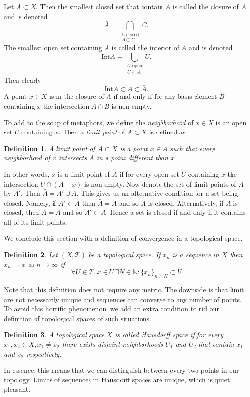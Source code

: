 \documentclass{article}
\newcommand{\Ta}{\mathcal{T}}
\newcommand{\N}{\mathbb{N}}
\newtheorem*{definition}{Definition}
\theoremstyle{remark}
\begin{document}
Let $A\subset X$. Then the smallest closed set that contain $A$ is called the closure of $A$ and is denoted 
$$\bar{A}=\bigcap_{\substack{C\text{ closed}\\A\subset C}} C.$$
The smallest open set containing $A$ is called the interior of $A$ and is denoted 
$$\text{Int} A = \bigcup_{\substack{U\text{ open}\\U\subset A}}U.$$ 
Then clearly
$$
    \text{Int}A\subset A\subset\bar{A}.
$$
A point $x\in X$ is in the closure of $A$ if and only if for any basis element $B$ containing $x$ the intersection $A\cap B$ is non empty.

To add to the soup of metaphors, we define the \textit{neighborhood} of $x\in X$ is an open set $U$ containing $x$. Then a \textit{limit point} of $A\subset X$ is defined as
\begin{definition}
    A limit point of $A\subset X$ is a point $x\in A$ such that every neighborhood of $x$ intersects $A$ in a point different than $x$
\end{definition}
In other words, $x$ is a limit point of $A$ if for every open set $U$ containing $x$ the intersection $U\cap(A-{x})$ is non empty. Now denote the set of limit points of $A$ by $A'$.
Then $\bar{A}=A'\cup A$. This gives us an alternative condition for a set being closed. Namely, if $A'\subset A$ then $\bar{A}=A$ and so $A$ is closed.
Alternatively, if $A$ is closed, then $\bar{A}=A$ and so $A'\subset A$.
Hence a set is closed if and only if it contains all of its limit points.

We conclude this section with a definition of convergence in a topological space.
\begin{definition}
    Let $(X,\Ta)$ be a topological space. If $x_n$ is a sequence in $X$ then $x_n\to x$ as $n\to\infty$ if
    $$
        \forall U\in\Ta, x\in U\,\exists N\in\N: \{x_n\}_{n\geq N}\subset U
    $$
\end{definition}
Note that this definition does not require any metric. The downside is that limit are not necessarily unique and sequences can converge to any number of points.
To avoid this horrific phenomenon, we add an extra condition to rid our definition of topological spaces of such situations. 
\begin{definition}
    A topological space $X$ is called \textit{Hausdorff space} if for every $x_1,x_2\in X, x_1\neq x_2$ there exists disjoint neighborhoods $U_1$ and $U_2$ that contain $x_1$ and $x_2$ respectively.
\end{definition}
In essence, this means that we can distinguish between every two points in our topology. Limits of sequences in Hausdorff spaces are unique, which is quiet pleasant.
\end{document}
